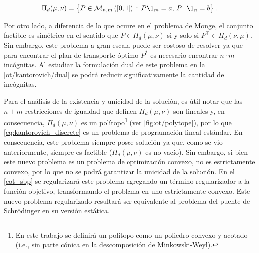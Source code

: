 \begin{equation}
	\label{eq:discrete_couplings_vectorial_form}
	\Pi_d(\mu,\nu) = \left\{P\in\matrixspace{n,m}{[0,1]}\,:\, P\1_{m}=a,\, P^\top \1_n = b\right\}.
\end{equation}

Por otro lado, a diferencia de lo que ocurre en el problema de Monge, el conjunto factible es simétrico en el sentido que $P\in \Pi_d(\mu,\nu)$ si y solo si $P^\top \in \Pi_d(\nu,\mu)$. Sin embargo, este problema a gran escala puede ser costoso de resolver ya que para encontrar el plan de transporte óptimo $P^*$ es necesario encontrar $n\cdot m$ incógnitas. Al estudiar la formulación dual de este problema en la \autoref{ot/kantorovich/dual} se podrá reducir significativamente la cantidad de incógnitas.

Para el análisis de la existencia y unicidad de la solución, es útil notar que las $n+m$ restricciones de igualdad que definen $\Pi_d(\mu,\nu)$ son lineales y, en consecuencia, $\Pi_d(\mu,\nu)$ es un polítopo\footnote{En este trabajo se definirá un polítopo como un poliedro convexo y acotado (i.e., sin parte cónica en la descomposición de Minkowski-Weyl).} (ver \autoref{fig:ot/polytope}), por lo que \eqref{eq:kantorovich_discrete} es un problema de programación lineal estándar. En consecuencia, este problema siempre posee solución ya que, como se vio anteriormente, siempre es factible ($\Pi_d(\mu,\nu)$ es no vacío). Sin embargo, si bien este nuevo problema es un problema de optimización convexo, no es estrictamente convexo, por lo que no se podrá garantizar la unicidad de la solución. En el \autoref{eot_sbp} se regularizará este problema agregando un término regularizador a la función objetivo, transformando el problema en uno estrictamente convexo. Este nuevo problema regularizado resultará ser equivalente al problema del puente de Schrödinger en su versión estática.


